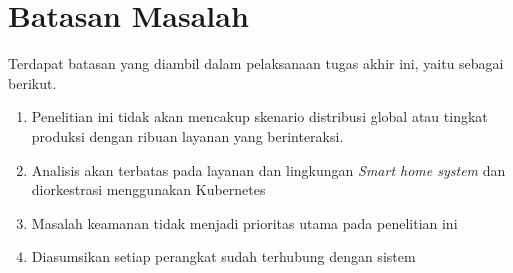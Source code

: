 \section{Batasan Masalah}
\label{sec:batasan-masalah}

Terdapat batasan yang diambil dalam pelaksanaan tugas akhir ini, yaitu sebagai berikut.

\begin{enumerate}
  \item Penelitian ini tidak akan mencakup skenario distribusi global atau tingkat produksi dengan ribuan layanan yang berinteraksi.
  \item Analisis akan terbatas pada layanan dan lingkungan
        \textit{Smart home system}  dan diorkestrasi menggunakan Kubernetes
  \item Masalah keamanan tidak menjadi prioritas utama pada penelitian ini
  \item Diasumsikan setiap perangkat sudah terhubung dengan sistem
\end{enumerate}

